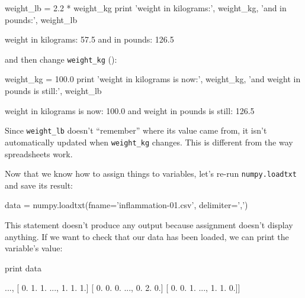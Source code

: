\documentclass{book}
\begin{document}
\begin{VerbIn}
weight_lb = 2.2 * weight_kg
print 'weight in kilograms:', weight_kg, 'and in pounds:', weight_lb
\end{VerbIn}

\begin{VerbOut}
weight in kilograms: 57.5 and in pounds: 126.5
\end{VerbOut}


and then change \texttt{weight\_kg} ():

\begin{VerbIn}
weight_kg = 100.0
print 'weight in kilograms is now:', weight_kg, 'and weight in pounds is still:', weight_lb
\end{VerbIn}

\begin{VerbOut}
weight in kilograms is now: 100.0 and weight in pounds is still: 126.5
\end{VerbOut}


Since \texttt{weight\_lb} doesn't ``remember'' where its value came
from, it isn't automatically updated when \texttt{weight\_kg} changes.
This is different from the way spreadsheets work.

Now that we know how to assign things to variables, let's re-run
\texttt{numpy.loadtxt} and save its result:

\begin{VerbIn}
data = numpy.loadtxt(fname='inflammation-01.csv', delimiter=',')
\end{VerbIn}

This statement doesn't produce any output because assignment doesn't
display anything. If we want to check that our data has been loaded, we
can print the variable's value:

\begin{VerbIn}
print data
\end{VerbIn}

\begin{VerbOut}
[[ 0.  0.  1. ...,  3.  0.  0.]
 [ 0.  1.  2. ...,  1.  0.  1.]
 [ 0.  1.  1. ...,  2.  1.  1.]
 ...,
 [ 0.  1.  1. ...,  1.  1.  1.]
 [ 0.  0.  0. ...,  0.  2.  0.]
 [ 0.  0.  1. ...,  1.  1.  0.]]
\end{VerbOut}
\end{document}

